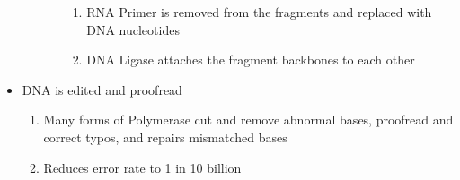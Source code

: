 \documentclass[12pt]{article}
\begin{document}
\begin{itemize}
\begin{enumerate}
\begin{enumerate}
\begin{enumerate}
              \item RNA Primer is removed from the fragments and replaced with DNA nucleotides

              \item DNA Ligase attaches the fragment backbones to each other

            \end{enumerate}

        \end{enumerate}

    \end{enumerate}

  \item DNA is edited and proofread

    \begin{enumerate}

      \item Many forms of Polymerase cut and remove abnormal bases, proofread and correct typos, and repairs mismatched bases

      \item Reduces error rate to 1 in 10 billion

    \end{enumerate}

\end{itemize}
\end{document}

